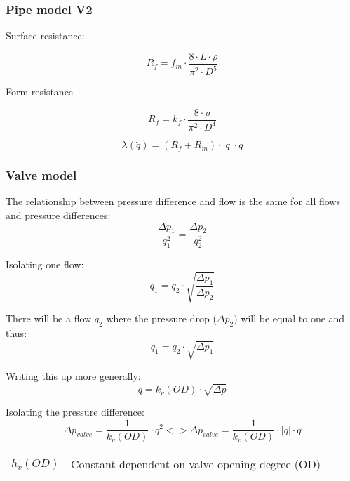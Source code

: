 \documentclass{article}
\begin{document}
	
	\subsubsection{Pipe model V2}
	
	Surface resistance:
	
	\begin{equation}
		R_f = f_m \cdot \frac{8 \cdot L \cdot \rho}{\pi^2 \cdot D^5}
	\end{equation}
	
	Form resistance
	
	\begin{equation}
		R_f = k_f \cdot \frac{8 \cdot \rho}{\pi^2 \cdot D^4}
	\end{equation}
	
	
	\begin{equation}
		\lambda (\dot q) = (R_f + R_m) \cdot |q| \cdot q
	\end{equation}


\subsubsection{Valve model}

The relationship between pressure difference and flow is the same for all flows and pressure differences:
\begin{equation}
	\frac{\Delta p_1}{q_1^2} = \frac{\Delta p_2}{q_2^2}
\end{equation}

Isolating one flow:
\begin{equation}
	q_1 = q_2 \cdot \sqrt{\frac{\Delta p_1}{\Delta p_2}}
\end{equation}

There will be a flow $q_2$ where the pressure drop ($\Delta p_2)$ will be equal to one and thus:
\begin{equation}
	q_1 = q_2 \cdot \sqrt{\Delta p_1}
\end{equation}

Writing this up more generally:
\begin{equation}
	q = k_v(OD) \cdot \sqrt{\Delta p}
\end{equation}

Isolating the pressure difference:
\begin{equation}
	\Delta p_{valve} = \frac{1}{k_v(OD)} \cdot q^2 <> \Delta p_{valve} = \frac{1}{k_v(OD)} \cdot |q| \cdot q
\end{equation}

\begin{center}
	\begin{tabular}{l p{8cm} l}
		$h_v(OD)$ & Constant dependent on valve opening degree (OD) \\
	\end{tabular}
\end{center}
\end{document}
